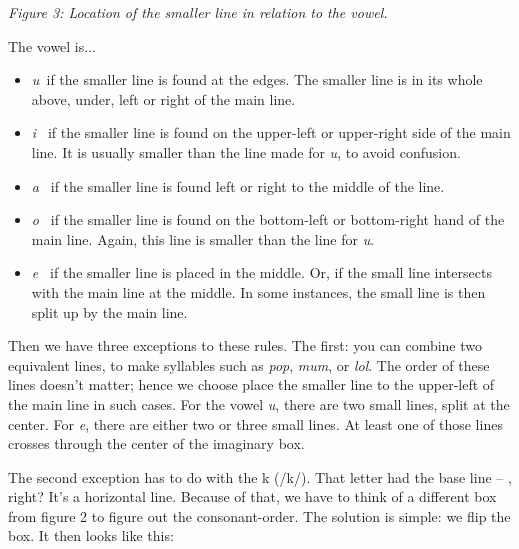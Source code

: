 {\footnotesize \it Figure 3: Location of the smaller line in relation to the vowel.}
\vspace{0.5cm}

The vowel is...
\begin{itemize}
\setlength{\itemsep}{0.25em}
\item {\it u\ }if the smaller line is found at the edges. The smaller line is in its whole above, under, left or right of the main line. 

\item {\it i\ } if the smaller line is found on the upper-left or upper-right side of the main line. It is usually smaller than the line made for {\it u}, to avoid confusion. 

\item {\it a\ } if the smaller line is found left or right to the middle of the line. 

\item {\it o\ } if the smaller line is found on the bottom-left or bottom-right hand of the main line. Again, this line is smaller than the line for {\it u}. 

\item{\it e\ } if the smaller line is placed in the middle. Or, if the small line intersects with the main line at the middle. In some instances, the small line is then split up by the main line.  
\end{itemize}

Then we have three exceptions to these rules. The first: you can combine two equivalent lines, to make syllables such as {\it pop}, {\it mum}, or {\it lol}. The order of these lines doesn't matter; hence we choose place the smaller line to the upper-left of the main line in such cases. For the vowel {\it u}, there are two small lines, split at the center. For {\it e}, there are either two or three small lines. At least one of those lines crosses through the center of the imaginary box.

The second exception has to do with the k (/k/). That letter had the base line -- , right? It's a horizontal line. Because of that, we have to think of a different box from figure 2 to figure out the consonant-order. The solution is simple: we flip the box. It then looks like this:

\vspace{0.5cm}
\begin{center}
\end{center}

